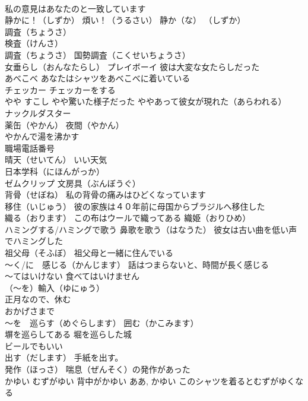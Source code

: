 \documentclass[8pt]{extreport}
\begin{document}
\begin{CJK}{UTF8}{min}
\\	私の意見はあなたのと一致しています
\\	静かに！（しずか） 煩い！（うるさい） 静か（な） （しずか）
\\	調査（ちょうさ） 
\\	検査（けんさ）
\\	調査（ちょうさ） 国勢調査（こくせいちょうさ）
\\	女垂らし（おんなたらし） プレイボーイ 彼は大変な女たらしだった
\\	あべこべ あなたはシャツをあべこべに着いている
\\	チェッカー チェッカーをする
\\	やや すこし やや驚いた様子だった ややあって彼女が現れた（あらわれる）
\\	ナックルダスター
\\	薬缶（やかん） 夜間（やかん） 
\\	やかんで湯を沸かす
\\	職場電話番号
\\	晴天（せいてん） いい天気
\\	日本学科（にほんがっか）
\\	ゼムクリップ 文房具（ぶんぼうぐ）
\\	背骨（せぼね） 私の背骨の痛みはひどくなっています
\\	移住（いじゅう） 彼の家族は４０年前に母国からブラジルへ移住した
\\	織る（おります） この布はウールで織ってある 織姫（おりひめ）
\\	ハミングする/ハミングで歌う 鼻歌を歌う（はなうた） 彼女は古い曲を低い声でハミングした
\\	祖父母（そふぼ） 祖父母と一緒に住んでいる
\\	～く/に　感じる（かんじます） 話はつまらないと、時間が長く感じる
\\	～てはいけない 食べてはいけません
\\	（～を）輸入（ゆにゅう）
\\	正月なので、休む
\\	おかげさまで
\\	～を　巡らす（めぐらします） 囲む（かこみます）
\\	塀を巡らしてある 堀を巡らした城
\\	ビールでもいい
\\	出す（だします） 手紙を出す。
\\	発作（ほっさ） 喘息（ぜんそく）の発作があった
\\	かゆい むずがゆい 背中がかゆい ああ, かゆい このシャツを着るとむずがゆくなる

\end{CJK}
\end{document}
